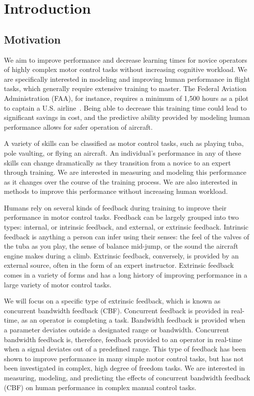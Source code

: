 \chapter{Introduction}

\section{Motivation}
\label{sec:intro_overview}
We aim to improve performance and decrease learning times for novice operators of highly complex motor control tasks without increasing cognitive workload.
We are specifically interested in modeling and improving human performance in flight tasks, which generally require extensive training to master.
The Federal Aviation Administration (FAA), for instance, requires a minimum of 1,500 hours as a pilot to captain a U.S. airline~\citep{FAA}.
Being able to decrease this training time could lead to significant savings in cost, and the predictive ability provided by modeling human performance allows for safer operation of aircraft.

A variety of skills can be classified as motor control tasks, such as playing tuba, pole vaulting, or flying an aircraft.
An individual's performance in any of these skills can change dramatically as they transition from a novice to an expert through training.
We are interested in measuring and modeling this performance as it changes over the course of the training process.
We are also interested in methods to improve this performance without increasing human workload.

Humans rely on several kinds of feedback during training to improve their performance in motor control tasks.
Feedback can be largely grouped into two types: internal, or intrinsic feedback, and external, or extrinsic feedback.
Intrinsic feedback is anything a person can infer using their senses: the feel of the valves of the tuba as you play, the sense of balance mid-jump, or the sound the aircraft engine makes during a climb.
Extrinsic feedback, conversely, is provided by an external source, often in the form of an expert instructor.
Extrinsic feedback comes in a variety of forms and has a long history of improving performance in a large variety of motor control tasks.

We will focus on a specific type of extrinsic feedback, which is known as concurrent bandwidth feedback (CBF).
Concurrent feedback is provided in real-time, as an operator is completing a task.
Bandwidth feedback is provided when a parameter deviates outside a designated range or bandwidth.
Concurrent bandwidth feedback is, therefore, feedback provided to an operator in real-time when a signal deviates out of a predefined range.
This type of feedback has been shown to improve performance in many simple motor control tasks, but has not been investigated in complex, high degree of freedom tasks.
We are interested in measuring, modeling, and predicting the effects of concurrent bandwidth feedback (CBF) on human performance in complex manual control tasks.

